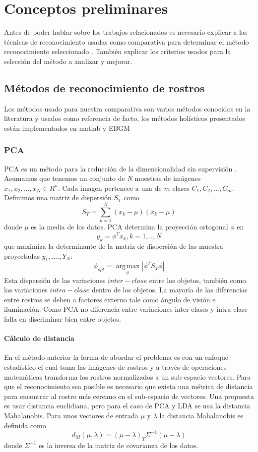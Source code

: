 \chapter{Conceptos preliminares}
Antes de poder hablar sobre los trabajos relacionados es necesario explicar a las técnicas de reconocimiento usadas como comparativa para determinar el método reconocimiento seleccionado \cite{zhao2003face}. También explicar los criterios usados para la selección del método a analizar y mejorar.
\section{Métodos de reconocimiento de rostros}
Los métodos usado para nuestra comparativa son varios métodos conocidos en la literatura y usados como referencia de facto, los métodos holísticos presentados están implementados en matlab\cite{struc2012phd} y \ac{EBGM}
\subsection{\ac{PCA}}
\ac{PCA} es un método para la reducción de la dimensionalidad sin supervisión \cite{sirovich1987low} \cite{turk1991eigenfaces}. Asumamos que tenemos un conjunto de \textit{N} muestras de imágenes $ { x_1,x_2,...,x_N} \in R^n$.
Cada imagen pertenece a una de $m$ clases $C_1,C_2,...,C_m$. Definimos una matriz de dispersión $S_T$ como \[ S_T= \sum_{k=1}^{N} (x_k-\mu)(x_k-\mu) \] donde $\mu$ es la media de los datos.
\ac{PCA} determina la proyección ortogonal $\phi$ en \[y_k=\phi^T x_k, k=1,..,N \] que maximiza  la determinante de la matriz de dispersión de las muestra proyectadas $y_1,....,Y_N$:
\[ \phi_{opt}= \operatorname*{arg\,max}_\phi \left|\phi^T S_T \phi  \right| \]
Esta dispersión de las variaciones $inter-clase$ entre los objetos, también como las variaciones $intra-clase$ dentro de los objetos. La mayoría de las diferencias entre rostros se deben a factores
externo tale como ángulo de visión e iluminación. Como \ac{PCA} no diferencia entre variaciones inter-clases y intra-clase falla en discriminar bien entre objetos.
\subsubsection{Cálculo de distancia}
En el método anterior la forma de abordar el problema es con un enfoque estadístico el cual toma las imágenes de rostros y a través de operaciones matemáticas transforma los rostros normalizados a un sub-espacio vectores. Para que el reconocimiento sea posible es necesario que exista una métrica de distancia para encontrar al rostro más cercano en el  sub-espacio de vectores.
Una propuesta es usar distancia euclidiana, pero para el caso de \ac{PCA} y \ac{LDA} se usa la distancia Mahalanobis. Para unos vectores de entrada $\mu$ y $\lambda$ la distancia Mahalanobis es definida como
\[d_M(\mu,\lambda)= (\mu-\lambda)_T \Sigma^{-1}(\mu-\lambda)\] donde $\Sigma^{-1}$ es la inversa de la matriz de covarianza de los datos.
